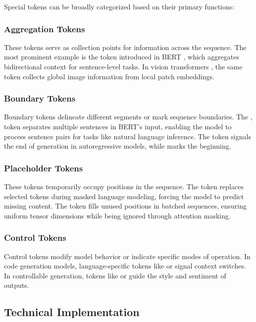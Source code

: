 Special tokens can be broadly categorized based on their primary functions:

\subsubsection{Aggregation Tokens}
These tokens serve as collection points for information across the sequence. The most prominent example is the \cls{} token introduced in BERT \citep{devlin2018bert}, which aggregates bidirectional context for sentence-level tasks. In vision transformers \citep{dosovitskiy2020image}, the same \cls{} token collects global image information from local patch embeddings.

\subsubsection{Boundary Tokens}
Boundary tokens delineate different segments or mark sequence boundaries. The \sep{} token separates multiple sentences in BERT's input, enabling the model to process sentence pairs for tasks like natural language inference. The \eos{} token signals the end of generation in autoregressive models, while \sos{} marks the beginning.

\subsubsection{Placeholder Tokens}
These tokens temporarily occupy positions in the sequence. The \mask{} token replaces selected tokens during masked language modeling, forcing the model to predict missing content. The \pad{} token fills unused positions in batched sequences, ensuring uniform tensor dimensions while being ignored through attention masking.

\subsubsection{Control Tokens}
Control tokens modify model behavior or indicate specific modes of operation. In code generation models, language-specific tokens like  or  signal context switches. In controllable generation, tokens like  or  guide the style and sentiment of outputs.

\subsection{Technical Implementation}

